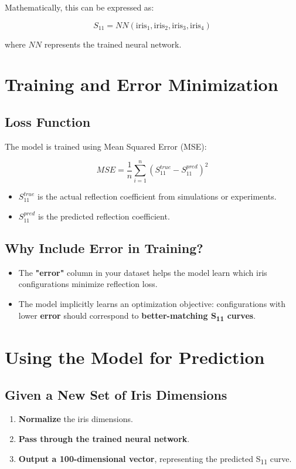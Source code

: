 \documentclass{article}
\begin{document}
Mathematically, this can be expressed as:

\[
S_{11} = NN(\text{iris}_1, \text{iris}_2, \text{iris}_3, \text{iris}_4)
\]

where \( NN \) represents the trained neural network.

\section{Training and Error Minimization}
\subsection{Loss Function}
The model is trained using Mean Squared Error (MSE):

\[
MSE = \frac{1}{n} \sum_{i=1}^{n} (S_{11}^{true} - S_{11}^{pred})^2
\]

\begin{itemize}
    \item \( S_{11}^{true} \) is the actual reflection coefficient from simulations or experiments.
    \item \( S_{11}^{pred} \) is the predicted reflection coefficient.
\end{itemize}

\subsection{Why Include Error in Training?}
\begin{itemize}
    \item The \textbf{"error"} column in your dataset helps the model learn which iris configurations minimize reflection loss.
    \item The model implicitly learns an optimization objective: configurations with lower \textbf{error} should correspond to \textbf{better-matching S\textsubscript{11} curves}.
\end{itemize}

\section{Using the Model for Prediction}
\subsection{Given a New Set of Iris Dimensions}
\begin{enumerate}
    \item \textbf{Normalize} the iris dimensions.
    \item \textbf{Pass through the trained neural network}.
    \item \textbf{Output a 100-dimensional vector}, representing the predicted S\textsubscript{11} curve.
\end{enumerate}
\end{document}
